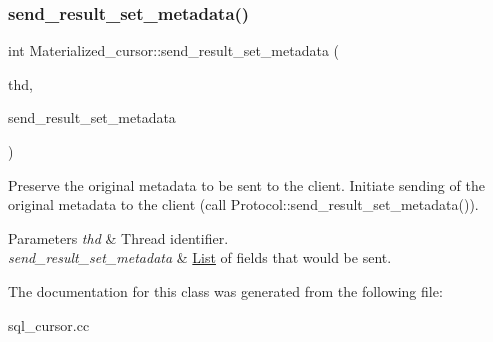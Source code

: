 \mbox{\label{classMaterialized__cursor_aaad0fe0d3f6b74209f9e6f82e118b621}} 
\subsubsection{\texorpdfstring{send\+\_\+result\+\_\+set\+\_\+metadata()}{send\_result\_set\_metadata()}}
{\footnotesize\ttfamily int Materialized\+\_\+cursor\+::send\+\_\+result\+\_\+set\+\_\+metadata (\begin{DoxyParamCaption}\item[{T\+HD $\ast$}]{thd,  }\item[{\mbox{\hyperlink{classList}{List}}$<$ \mbox{\hyperlink{classItem}{Item}} $>$ \&}]{send\+\_\+result\+\_\+set\+\_\+metadata }\end{DoxyParamCaption})}

Preserve the original metadata to be sent to the client. Initiate sending of the original metadata to the client (call Protocol\+::send\+\_\+result\+\_\+set\+\_\+metadata()).


\begin{DoxyParams}{Parameters}
{\em thd} & Thread identifier. \\
\hline
{\em send\+\_\+result\+\_\+set\+\_\+metadata} & \mbox{\hyperlink{classList}{List}} of fields that would be sent. \\
\hline
\end{DoxyParams}


The documentation for this class was generated from the following file\+:\begin{DoxyCompactItemize}
\item 
sql\+\_\+cursor.\+cc\end{DoxyCompactItemize}
